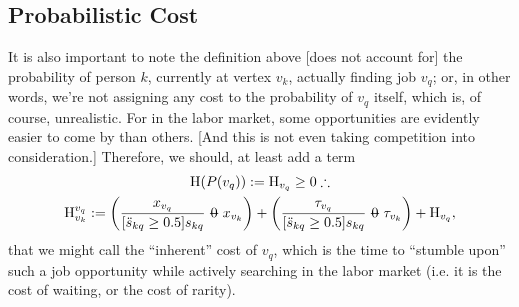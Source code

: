 \documentclass[12pt, a4paper]{article}
\makeatletter
\newcommand{\superimpose}[2]{{
  \ooalign{
    \hfil$\m@th#1\@firstoftwo#2$\hfil\cr
    \hfil$\m@th#1\@secondoftwo#2$\hfil\cr
  }
}}
\newcommand{\stack}[2]{\mathbin{\mathpalette\superimpose{{#1}{#2}}}}
\newcommand{\minuszero}{\stack{0}{-}}
\newcommand{\Eta}{\text{H}}
\makeatother
\begin{document}
\subsection{Probabilistic Cost}
It is also important to note the definition above [does not account for] the
probability of person $k$, currently at vertex $v_k$, actually finding job
$v_q$; or, in other words, we're not assigning any cost to the probability of
$v_q$ itself, which is, of course, unrealistic. For in the labor market, some
opportunities are evidently easier to come by than others. [And this is not
    even taking competition into consideration.] Therefore, we should, at least add
a term
\begin{gather}
  \Eta(P(v_q))
  :=
  \Eta_{v_q}
  \geq 0
  \therefore
  \\
  \Eta_{v_k}^{v_q}
  :=
  \left(
  \frac{x_{v_q}}{[\ddot{s}_{kq} \geq 0.5] s_{kq}}
  \minuszero
  x_{v_k}
  \right)
  +
  \left(
  \frac{\tau_{v_q}}{[\ddot{s}_{kq} \geq 0.5] s_{kq}}
  \minuszero
  \tau_{v_k}
  \right)
  +
  \Eta_{v_q}
  ,
\end{gather}
that we might call the ``inherent'' cost of $v_q$, which is the time to ``stumble upon'' such a job opportunity while actively searching in the labor market (i.e. it is the cost of waiting, or the cost of rarity).
\end{document}
